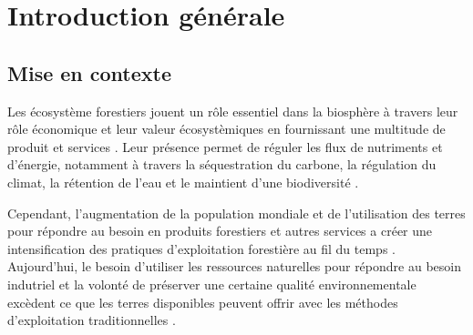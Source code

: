 \chapter*{Introduction générale}         %
\label{chap-introduction}       %


\section*{Mise en contexte}
\label{sec:contexte}


Les écosystème forestiers jouent un rôle essentiel dans la biosphère à travers leur rôle économique et leur valeur écosystèmiques en fournissant une multitude de produit et services \citep{Balvanera2006Quantifyingevidence}. 
Leur présence permet de réguler les flux de nutriments et d'énergie, notamment à travers la séquestration du carbone, la régulation du climat, la rétention de l'eau et le maintient d'une biodiversité \citep{Balvanera2006Quantifyingevidence,Diaz2006BiodiversityLoss,Canadell2008Managingforests,Pawson2013Plantationforests}. 


Cependant, l'augmentation de la population mondiale et de l'utilisation des terres pour répondre au besoin en produits forestiers et autres services a créer une intensification des pratiques d’exploitation forestière au fil du temps \citep{Foley2005GlobalConsequences}.
Aujourd'hui, le besoin d'utiliser les ressources naturelles pour répondre au besoin indutriel et la volonté de préserver une certaine qualité environnementale excèdent ce que les terres disponibles peuvent offrir avec les méthodes d'exploitation traditionnelles \citep{Sala2000Globalbiodiversity,Newbold2015Globaleffects}. 


